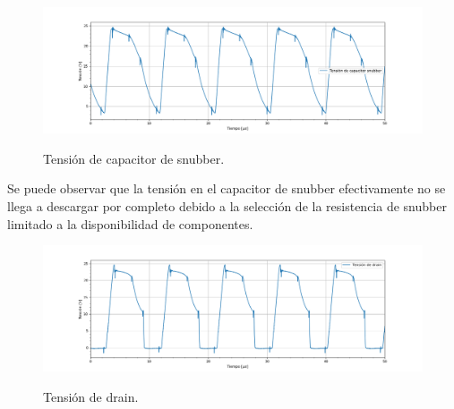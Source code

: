 \begin{figure}[H]
	\centering
	\includegraphics[width=0.9\linewidth]{ImagenesParteIV/Vcsnubber.png}
	\label{fig:vcsnubb_4}
	\caption{Tensión de capacitor de snubber.}
\end{figure}
Se puede observar que la tensión en el capacitor de snubber efectivamente no se llega a descargar por completo debido a la selección de la resistencia de snubber limitado a la disponibilidad de componentes.
\begin{figure}[H]
	\centering
	\includegraphics[width=0.9\linewidth]{ImagenesParteIV/Vds.png}
	\label{fig:vds_4}
	\caption{Tensión de drain.}
\end{figure}

